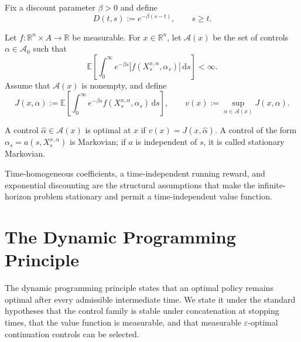 Fix a discount parameter \(\beta>0\) and define
\[
D(t,s):=e^{-\beta(s-t)},
\qquad s\ge t.
\]

\begin{de}
Let \(f:\mathbb R^n\times A\to\mathbb R\) be measurable. For \(x\in\mathbb R^n\), let \(\mathcal A(x)\) be the set of controls \(\alpha\in\mathcal A_0\) such that
\[
\mathbb E\!\left[
\int_0^\infty e^{-\beta s}
|f(X_s^{x,\alpha},\alpha_s)|\,\mathrm ds
\right]<\infty.
\]
Assume that \(\mathcal A(x)\) is nonempty, and define
\[
J(x,\alpha)
:=\mathbb E\!\left[
\int_0^\infty e^{-\beta s}
 f(X_s^{x,\alpha},\alpha_s)\,\mathrm ds
\right],
\qquad
v(x):=\sup_{\alpha\in\mathcal A(x)}J(x,\alpha).
\]
\end{de}

\begin{de}
A control \(\hat\alpha\in\mathcal A(x)\) is optimal at \(x\) if \(v(x)=J(x,\hat\alpha)\). A control of the form \(\alpha_s=a(s,X_s^{x,\alpha})\) is Markovian; if \(a\) is independent of \(s\), it is called stationary Markovian.
\end{de}

\begin{remark}
Time-homogeneous coefficients, a time-independent running reward, and exponential discounting are the structural assumptions that make the infinite-horizon problem stationary and permit a time-independent value function.
\end{remark}

\section{The Dynamic Programming Principle}

The dynamic programming principle states that an optimal policy remains optimal after every admissible intermediate time. We state it under the standard hypotheses that the control family is stable under concatenation at stopping times, that the value function is measurable, and that measurable \(\varepsilon\)-optimal continuation controls can be selected.


